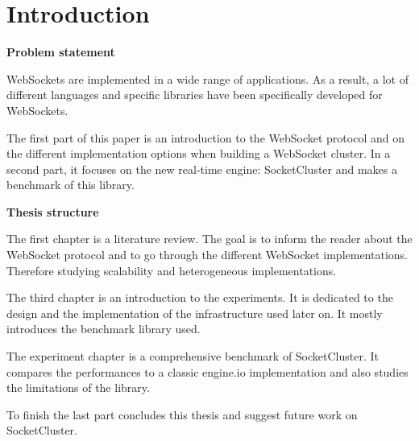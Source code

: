 \chapter*{Introduction}


\textbf{Problem statement}

WebSockets are implemented in a wide range of applications. As a result, a lot
of different languages and specific libraries have been specifically developed
for WebSockets.

The first part of this paper is an introduction to the WebSocket protocol and
on the different implementation options when building a WebSocket cluster. In a
second part, it focuses on the new real-time engine: SocketCluster and makes a
benchmark of this library.


\textbf{Thesis structure}

The first chapter is a literature review. The goal is to inform the reader
about the WebSocket protocol and to go through the different WebSocket
implementations. Therefore studying scalability and heterogeneous
implementations.

The third chapter is an introduction to the experiments. It is dedicated to the
design and the implementation of the infrastructure used later on. It mostly 
introduces the benchmark library used.

The experiment chapter is a comprehensive benchmark of SocketCluster. It 
compares the performances to a classic engine.io implementation and also
studies the limitations of the library.

To finish the last part concludes this thesis and suggest future work on 
SocketCluster.


